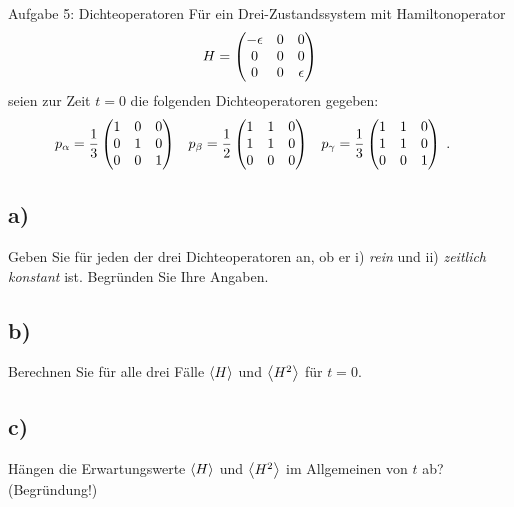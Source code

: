 \begin{aufgabe}{Aufgabe 5: Dichteoperatoren}
    Für ein Drei-Zustandssystem mit Hamiltonoperator
    \[
        H = \begin{pmatrix}-\epsilon & 0 & 0 \\ 0 & 0 & 0 \\ 0 & 0 & \epsilon\end{pmatrix}
    \]
    seien zur Zeit $t = 0$ die folgenden Dichteoperatoren gegeben:
    \begin{align*}
        p_\alpha &= \frac{1}{3}\begin{pmatrix}1 & 0 & 0 \\ 0 & 1 & 0 \\ 0 & 0 & 1\end{pmatrix} &
        p_\beta  &= \frac{1}{2}\begin{pmatrix}1 & 1 & 0 \\ 1 & 1 & 0 \\ 0 & 0 & 0\end{pmatrix} &
        p_\gamma &= \frac{1}{3}\begin{pmatrix}1 & 1 & 0 \\ 1 & 1 & 0 \\ 0 & 0 & 1\end{pmatrix} \;.
    \end{align*}

    \subsection{a)}
    Geben Sie für jeden der drei Dichteoperatoren an,
    ob er
    i) \textit{rein}
    und
    ii) \textit{zeitlich konstant}
    ist.
    Begründen Sie Ihre Angaben.

    \subsection{b)}
    Berechnen Sie für alle drei Fälle $\left\langle H\right\rangle$ und $\left\langle H^2\right\rangle$ für $t=0$.

    \subsection{c)}
    Hängen die Erwartungswerte $\left\langle H\right\rangle$ und $\left\langle H^2\right\rangle$ im Allgemeinen von $t$ ab?
    (Begründung!)
\end{aufgabe}

